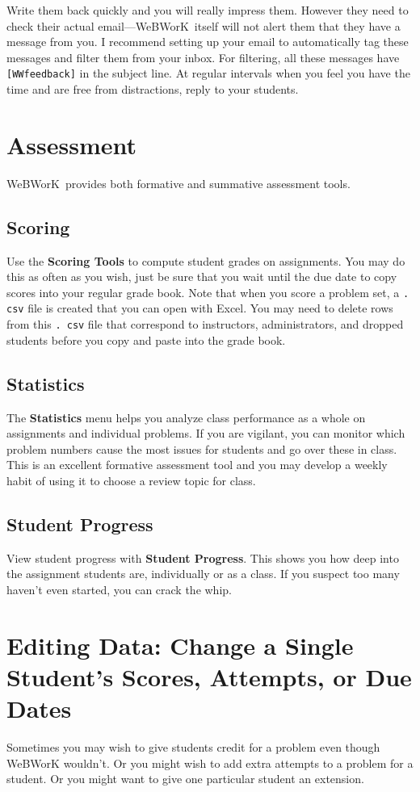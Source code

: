 \documentclass[12pt]{article}
\newcommand{\menu}[1]{\textbf{#1}}
\newcommand{\WW}{WeBWorK}
\begin{document}
Write them back quickly and you will really impress them.
However they need to check their actual email---\WW\ itself will not alert them that they have a message from you.
I recommend setting up your email to automatically tag these messages and filter them from your inbox.
For filtering, all these messages have \texttt{[WWfeedback]} in the subject line.
At regular intervals when you feel you have the time and are free from distractions, reply to your students.

\section{Assessment}
\WW\ provides both formative and summative assessment tools.
\subsection{Scoring}
Use the \menu{Scoring Tools} to compute student grades on assignments.
You may do this as often as you wish, just be sure that you wait until the due date to copy scores into your regular grade book.
Note that when you score a problem set, a \texttt{.
	csv} file is created that you can open with Excel.
You may need to delete rows from this \texttt{.
	csv} file that correspond to instructors, administrators, and dropped students before you copy and paste into the grade book.

\subsection{Statistics}
The \menu{Statistics} menu helps you analyze class performance as a whole on assignments and individual problems.
If you are vigilant, you can monitor which problem numbers cause the most issues for students and go over these in class.
This is an excellent formative assessment tool and you may develop a weekly habit of using it to choose a review topic for class.

\subsection{Student Progress}
View student progress with \menu{Student Progress}.
This shows you how deep into the assignment students are, individually or as a class.
If you suspect too many haven't even started, you can crack the whip.

\section{Editing Data: Change a Single Student's Scores, Attempts, or Due Dates}
Sometimes you may wish to give students credit for a problem even though WeBWorK wouldn't.
Or you might wish to add extra attempts to a problem for a student.
Or you might want to give one particular student an extension.
\end{document}
